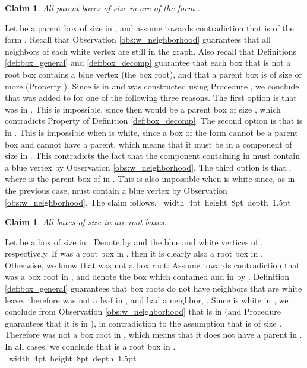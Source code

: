\documentclass[11pt]{article}
\def\Proof{\par\noindent{\bf Proof:~}}
\def\blackslug{\hbox{\hskip 1pt \vrule width 4pt height 8pt
    depth 1.5pt \hskip 1pt}}
\def\QED{\quad\blackslug\lower 8.5pt\null\par}
\newtheorem{claim}[theorem]{Claim}
\theoremstyle{definition}
\begin{document}
\begin{claim}
\label{claim:ana_box:p1_bw}
All parent boxes of size  in  are of the form .
\end{claim}
\Proof
Let  be a parent box of size  in , 
and assume towards contradiction that  is of the form .
Recall that Observation \ref{obs:w_neighborhood} guarantees that all neighbors of each white vertex are still in the graph.
Also recall that Definitions \ref{def:box_general} and \ref{def:box_decomp} guarantee that each box that is not a root box contains a blue vertex (the box root), and that a parent box is of size  or more (Property ).
Since  is in  and  was constructed using Procedure , we conclude that  was added to  for one of the following three reasons.
The first option is that  was in . This is impossible, since then  would be a parent box of size , which contradicts Property  of Definition \ref{def:box_decomp}.
The second option is that  is in . This is impossible when  is white, since a box of the form  cannot be a parent box and cannot have a parent, which means that it must be in a component of size  in . This contradicts the fact that the component containing  in  must contain a blue vertex by Observation \ref{obs:w_neighborhood}.
The third option is that , where  is the parent box of  in . This is also impossible when  is white since, as in the previous case,  must contain a blue vertex by Observation \ref{obs:w_neighborhood}.
The claim follows.
\QED

\begin{claim}
\label{claim:ana_box:p1_root}
All boxes of size  in  are root boxes.
\end{claim}
\Proof
Let  be a box of size  in .
Denote by  and  the blue and white vertices of , respectively.
If  was a root box in , then it is clearly also a root box in .
Otherwise, we know that  was not a box root:
Assume towards contradiction that  was a box root in , and denote the box which contained  and  in  by .
Definition \ref{def:box_general} guarantees that box roots do not have neighbors that are white leave, therefore  was not a leaf in , and had a neighbor, .
Since  is white in , we conclude from Observation \ref{obs:w_neighborhood} that  is in  (and Procedure  guarantees that it is in ), in contradiction to the assumption that  is of size .
Therefore  was not a box root in , which means that it does not have a parent in .
In all cases, we conclude that  is a root box in .
\QED
\end{document}
